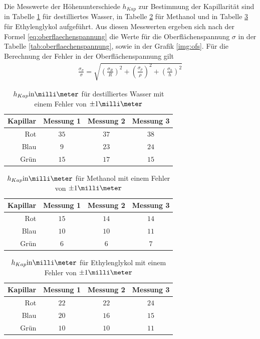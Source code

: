 \documentclass[12pt, a4paper, twoside]{scrartcl}
\begin{document}
Die Messwerte der Höhenunterschiede $h_{Kap}$ zur Bestimmung der Kapillarität sind in Tabelle \ref{tab:h_kap_was} für destilliertes Wasser, in Tabelle \ref{tab:h_kap_met} für Methanol und in Tabelle \ref{tab:h_kap_eth} für Ethylenglykol aufgeführt.
Aus diesen Messwerten ergeben sich nach der Formel \eqref{eq:oberflaechenspannung} die Werte für die Oberflächenspannung $\sigma$  in der Tabelle \ref{tab:oberflaechenspannung}, sowie in der Grafik \ref{img:ofs}.
Für die Berechnung der Fehler in der Oberflächenspannung gilt
\begin{align}
  \frac{\sigma_\sigma}{\sigma} = \sqrt{\left(\frac{\sigma_{R}}{R}\right)^2 + \left(\frac{\sigma_{\rho}}{\rho}\right) ^2 + \left(\frac{\sigma_{h}}{h}\right)^2} 
\end{align}

\begin{table}[!h]
\centering
\begin{tabular}{r|c|c|c}
    Kapillar & Messung 1 & Messung 2 & Messung 3\\
    \hline
    Rot & $35$ & $37$ & $38$ \\
    Blau & $9$ & $23$ & $24$ \\
    Grün & $15$ & $17$ & $15$ \\
    
 \end{tabular} 
 \caption{\label{tab:h_kap_was}$h_{Kap} \rm{in} \milli\meter$ für destilliertes Wasser mit einem Fehler von $\pm 1\milli\meter$}
\end{table}

\begin{table}[!h]
\centering
\begin{tabular}{r|c|c|c}
    Kapillar & Messung 1 & Messung 2 & Messung 3\\
    \hline
    Rot & $15$ & $14$ & $14$\\
    Blau & $10$ & $10$ & $11$ \\
    Grün & $6$ & $6$ & $7$\\
    
 \end{tabular} 
 \caption{\label{tab:h_kap_met}$h_{Kap} \rm{in} \milli\meter$ für Methanol mit einem Fehler von $\pm 1\milli\meter$}
\end{table}

\begin{table}[!h]
\centering
\begin{tabular}{r|c|c|c}
    Kapillar & Messung 1 & Messung 2 & Messung 3\\
    \hline
    Rot & $22$ & $22$ & $24$\\
    Blau & $20$ & $16$ & $15$ \\
    Grün & $10$ & $10$ & $11$\\
    
 \end{tabular} 
 \caption{\label{tab:h_kap_eth}$h_{Kap} \rm{in} \milli\meter$ für Ethylenglykol mit einem Fehler von $\pm 1\milli\meter$}
\end{table}
\end{document}
